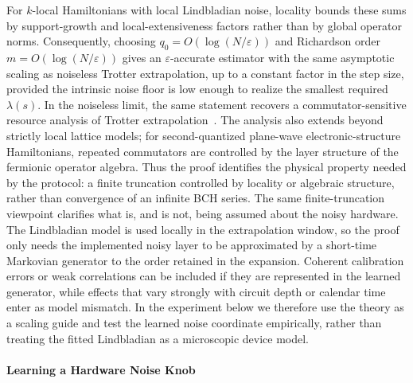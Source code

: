 \documentclass[aps,pra,reprint,superscriptaddress]{revtex4-2}
\newcommand{\eps}{\varepsilon}
\begin{document}
For $k$-local Hamiltonians with local Lindbladian noise, locality bounds these sums by support-growth and local-extensiveness factors rather than by global operator norms.
Consequently, choosing $q_0=O(\log(N/\eps))$ and Richardson order $m=O(\log(N/\eps))$ gives an $\eps$-accurate estimator with the same asymptotic scaling as noiseless Trotter extrapolation, up to a constant factor in the step size, provided the intrinsic noise floor is low enough to realize the smallest required $\lambda(s)$.
In the noiseless limit, the same statement recovers a commutator-sensitive resource analysis of Trotter extrapolation~\cite{watson2025exponentially,mizuta2025commutator}.
The analysis also extends beyond strictly local lattice models; for second-quantized plane-wave electronic-structure Hamiltonians, repeated commutators are controlled by the layer structure of the fermionic operator algebra.
Thus the proof identifies the physical property needed by the protocol: a finite truncation controlled by locality or algebraic structure, rather than convergence of an infinite BCH series.
The same finite-truncation viewpoint clarifies what is, and is not, being assumed about the noisy hardware.
The Lindbladian model is used locally in the extrapolation window, so the proof only needs the implemented noisy layer to be approximated by a short-time Markovian generator to the order retained in the expansion.
Coherent calibration errors or weak correlations can be included if they are represented in the learned generator, while effects that vary strongly with circuit depth or calendar time enter as model mismatch.
In the experiment below we therefore use the theory as a scaling guide and test the learned noise coordinate empirically, rather than treating the fitted Lindbladian as a microscopic device model.
\\\\
\textbf{Learning a Hardware Noise Knob}
\end{document}
